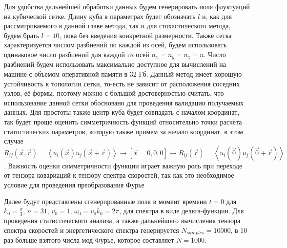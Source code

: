 Для удобства дальнейшей обработки данных будем генерировать поля флуктуаций на кубической сетке. Длину куба в параметрах будет обозначать $l$ и, как для рассматриваемого в данной главе метода, так и для стохастического метода, будем брать $l = 10$, пока без введения конкретной размерности. Также сетка характеризуется числом разбиений по каждой из осей, будем использовать одинаковое число разбиений для каждой из осей $n_x = n_y = n_z = n$. Число разбиений будем использовать максимально доступное для вычислений на машине с объемом оперативной памяти в 32 Гб. Данный метод имеет хорошую устойчивость к топологии сетки, то-есть не зависит от расположения соседних узлов, её формы, поэтому можно с большой достоверностью считать, что использование данной сетки обосновано для проведения валидации получаемых данных. Для простоты также центр куба будет совпадать с началом координат, так будет проще оценить симметричность функций относительно точки расчёта статистических параметров, которую также примем за начало координат, в этом случае $R_{ij}(\vec x, \vec r) = \left< u_i(\vec x) u_j(\vec x + \vec r) \right> \rightarrow \left[ \vec x = {0, 0, 0} \right] \rightarrow R_{ij}(\vec r) = \left< u_i(\vec 0) u_j(\vec 0 + \vec r) \right>$. Важность оценки симметричности функции играет важную роль при переходе от тензора ковариаций к тензору спектра скоростей, так как это необходимое условие для проведения преобразования Фурье

Далее будут представлены сгенерированные поля в момент времени $t = 0$ для $k_0 = \frac{\pi}{3}$, $n = 31$, $v_0 = 1$, $\omega_0 = v_0 k_0 = 2 \pi$, для спектра в виде дельта-функции. Для проведения статистического анализа, а также дальнейшего вычисления тензора спектра скоростей и энергетического спектра генерируется $N_{samples} = 10000$, в 10 раз больше взятого числа мод Фурье, которое составляет $N = 1000$. 

